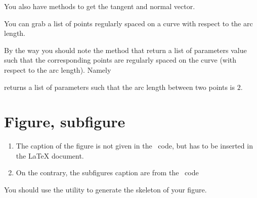 \begin{center}
   
\end{center}

You also have methods to get the tangent and normal vector. 




\begin{center}
   
\end{center}


You can grab a list of points regularly spaced on a curve with respect to the arc length.



\begin{center}
   
\end{center}

By the way you should note the method  that return a list of parameters value such that the corresponding points are regularly spaced on the curve (with respect to the arc length). Namely



returns a list of parameters such that the arc length between two points is \( 2\).

\section{Figure, subfigure}

\begin{enumerate}
    \item
        The caption of the figure is not given in the \phystricks\ code, but has to be inserted in the LaTeX document.
    \item 
        On the contrary, the subfigures caption are from the \phystricks\ code
\end{enumerate}
You should use the utility  to generate the skeleton of your figure.

